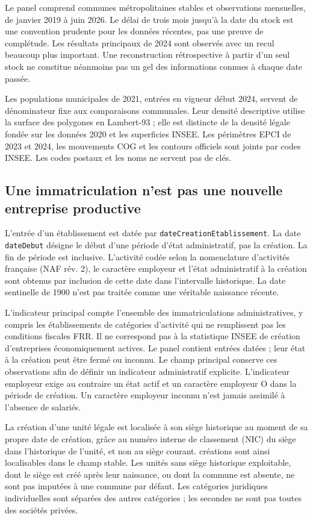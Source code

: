 Le panel comprend \CommuneN{} communes métropolitaines stables et \PanelN{} observations mensuelles, de janvier 2019 à juin 2026. Le délai de trois mois jusqu’à la date du stock est une convention prudente pour les données récentes, pas une preuve de complétude. Les résultats principaux de 2024 sont observés avec un recul beaucoup plus important. Une reconstruction rétrospective à partir d’un seul stock ne constitue néanmoins pas un gel des informations connues à chaque date passée.

Les populations municipales de 2021, entrées en vigueur début 2024, servent de dénominateur fixe aux comparaisons communales. Leur densité descriptive utilise la surface des polygones en Lambert-93 ; elle est distincte de la densité légale fondée sur les données 2020 et les superficies INSEE. Les périmètres EPCI de 2023 et 2024, les mouvements COG et les contours officiels sont joints par codes INSEE. Les codes postaux et les noms ne servent pas de clés.

\subsection{Une immatriculation n’est pas une nouvelle entreprise productive}
L’entrée d’un établissement est datée par \texttt{dateCreationEtablissement}. La date \texttt{dateDebut} désigne le début d’une période d’état administratif, pas la création. La fin de période est inclusive. L’activité codée selon la nomenclature d’activités française (NAF rév. 2), le caractère employeur et l’état administratif à la création sont obtenus par inclusion de cette date dans l’intervalle historique. La date sentinelle de 1900 n’est pas traitée comme une véritable naissance récente.

L’indicateur principal compte l’ensemble des immatriculations administratives, y compris les établissements de catégories d’activité qui ne remplissent pas les conditions fiscales FRR. Il ne correspond pas à la statistique INSEE de création d’entreprises économiquement actives. Le panel contient \BirthN{} entrées datées ; leur état à la création peut être fermé ou inconnu. Le champ principal conserve ces observations afin de définir un indicateur administratif explicite. L’indicateur employeur exige au contraire un état actif et un caractère employeur O dans la période de création. Un caractère employeur inconnu n’est jamais assimilé à l’absence de salariés.

La création d’une unité légale est localisée à son siège historique au moment de sa propre date de création, grâce au numéro interne de classement (NIC) du siège dans l’historique de l’unité, et non au siège courant. \ULBirthN{} créations sont ainsi localisables dans le champ stable. Les unités sans siège historique exploitable, dont le siège est créé après leur naissance, ou dont la commune est absente, ne sont pas imputées à une commune par défaut. Les catégories juridiques individuelles sont séparées des autres catégories ; les secondes ne sont pas toutes des sociétés privées.


